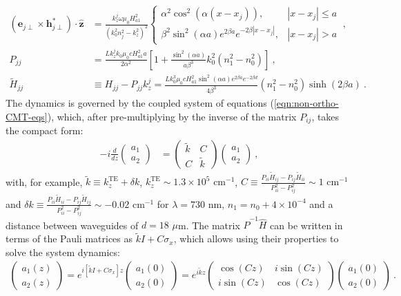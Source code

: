 \begin{align*}
	\left(\textbf{e}_{j\perp}\times\textbf{h}_{j\perp}^*\right)\cdot \hat{\textbf{z}}&=\frac{k_z^j\omega\mu_0 H_{a1}^2}{(k_0^2n_j^2-k_z^2)^2} \left\{ \begin{matrix}
\alpha^2\cos^2(\alpha (x-x_j)), & |x-x_j| \le a
\\
\beta^2 \sin^2(\alpha a) e^{2\beta a} e^{-2\beta|x-x_j|}, & |x-x_j|>a
\end{matrix}\right. \ ,
\\
	P_{jj} &= \frac{L k_z^j  k_0 \mu_0 c H_{a1}^2  a}{2 \alpha^2} \left[1 + \frac{\sin^2(\alpha a)}{a \beta^3 } k_0^2 \left( n_1^2 - n_0^2 \right) \right] \ ,
\\
	\tilde{H}_{jj} &\equiv H_{jj} - P_{jj} k_z^j =
	\frac{L k_0^3  \mu_0 c H_{a1}^2 \sin^2(\alpha a)e^{2\beta a}e^{-2\beta d}}{4 \beta^3 } (n_1^2-n_0^2) \sinh(2\beta a) \ .
\end{align*}
The dynamics is governed by the coupled system of equations (\ref{eqn:non-ortho-CMT-eqs}), which, after pre-multiplying by the inverse of the matrix $P_{ij}$, takes the compact form:
\begin{align*}
	-i\frac{d}{dz}\begin{pmatrix}
	a_1
	\\
	a_2
	\end{pmatrix} &= 	
	\begin{pmatrix}
	\tilde{k} & C
	\\
	C & \tilde{k}
	\end{pmatrix}
	\begin{pmatrix}
	a_1
	\\
	a_2
	\end{pmatrix} \ ,
\end{align*}
with, for example, $\tilde{k}\equiv k_z^{\text{TE}} + \delta k$, $k_z^{\text{TE}} \sim 1.3\times10^5 \text{ cm}^{-1}$, $C\equiv \frac{P_{ii} \tilde{H}_{ij}  -P_{ij}\tilde{H}_{ii}}{P_{ii}^2-P_{ij}^2} \sim 1\text{ cm}^{-1}$ and $\delta k \equiv \frac{P_{ii} \tilde{H}_{ii} -P_{ij}\tilde{H}_{ij}}{P_{ii}^2-P_{ij}^2} \sim -0.02\text{ cm}^{-1}$ for $\lambda = 730$ nm, $n_1 = n_0 + 4\times10^{-4}$ and a distance between waveguides of $d = 18 $ $\mu$m. The matrix $\hat{P}^{-1}\hat{H}$ can be written in terms of the Pauli matrices as $\tilde{k}I + C\sigma_x $, which allows using their properties to solve the system dynamics:
\begin{align*}
	\begin{pmatrix}
	a_1(z)
	\\
	a_2(z)
	\end{pmatrix}
	=
	e^{{i\left[\tilde{k}I + C\sigma_x\right]z }}	\begin{pmatrix}
	a_1(0)
	\\
	a_2(0)
	\end{pmatrix}
	=
	e^{i\tilde{k}z}
	\begin{pmatrix}
	\cos(Cz) & i\sin(Cz)
	\\
	i\sin(Cz) & \cos(Cz)
	\end{pmatrix}
	\begin{pmatrix}
	a_1(0)
	\\
	a_2(0)
	\end{pmatrix} \ .
\end{align*}
